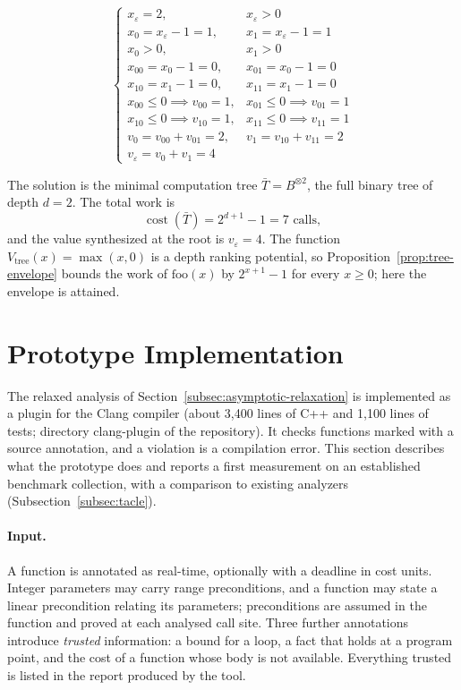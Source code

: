 \documentclass[oneside,english]{amsart}
\numberwithin{equation}{section}
\numberwithin{figure}{section}
\theoremstyle{plain}
\theoremstyle{definition}
\theoremstyle{plain}
\theoremstyle{remark}
\theoremstyle{plain}
\theoremstyle{definition}
\theoremstyle{plain}
\theoremstyle{remark}
\DeclareMathOperator{\cost}{cost}
\newcommand{\lean}[1]{{\ttfamily\small #1}}
\begin{document}
\[
\begin{cases}
x_{\varepsilon} = 2, & x_{\varepsilon} > 0 \\
x_{0} = x_{\varepsilon} - 1 = 1, & x_{1} = x_{\varepsilon} - 1 = 1 \\
x_{0} > 0, & x_{1} > 0 \\
x_{00} = x_{0} - 1 = 0, & x_{01} = x_{0} - 1 = 0 \\
x_{10} = x_{1} - 1 = 0, & x_{11} = x_{1} - 1 = 0 \\
x_{00} \le 0 \implies v_{00} = 1, & x_{01} \le 0 \implies v_{01} = 1 \\
x_{10} \le 0 \implies v_{10} = 1, & x_{11} \le 0 \implies v_{11} = 1 \\
v_{0} = v_{00} + v_{01} = 2, & v_{1} = v_{10} + v_{11} = 2 \\
v_{\varepsilon} = v_{0} + v_{1} = 4
\end{cases}
\]

The solution is the minimal computation tree $\bar{T} = B^{\otimes 2}$, the full binary tree of depth $d = 2$. The total work is
\[
\cost(\bar{T}) = 2^{d+1} - 1 = 7 \text{ calls},
\]
and the value synthesized at the root is $v_{\varepsilon} = 4$. The function $V_{\text{tree}}(x) = \max(x, 0)$ is a depth ranking potential, so Proposition~\ref{prop:tree-envelope} bounds the work of $\text{foo}(x)$ by $2^{x+1} - 1$ for every $x \ge 0$; here the envelope is attained.

\section{Prototype Implementation}
\label{sec:implementation}

The relaxed analysis of Section~\ref{subsec:asymptotic-relaxation} is implemented as a plugin for the Clang compiler (about 3{,}400 lines of C++ and 1{,}100 lines of tests; directory \lean{clang-plugin} of the repository). It checks functions marked with a source annotation, and a violation is a compilation error. This section describes what the prototype does and reports a first measurement on an established benchmark collection, with a comparison to existing analyzers (Subsection~\ref{subsec:tacle}).

\paragraph{Input.}
A function is annotated as real-time, optionally with a deadline in cost units. Integer parameters may carry range preconditions, and a function may state a linear precondition relating its parameters; preconditions are assumed in the function and proved at each analysed call site. Three further annotations introduce \emph{trusted} information: a bound for a loop, a fact that holds at a program point, and the cost of a function whose body is not available. Everything trusted is listed in the report produced by the tool.
\end{document}
